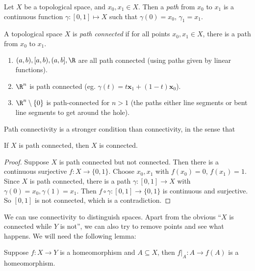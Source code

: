 \documentclass[a4paper]{article}
\begin{document}
\begin{defi}[Path]
  Let $X$ be a topological space, and $x_0, x_1 \in X$. Then a \emph{path} from $x_0$ to $x_1$ is a continuous function $\gamma: [0, 1] \mapsto X$ such that $\gamma(0) = x_0$, $\gamma_1 = x_1$.
\end{defi}

\begin{defi}
  A topological space $X$ is \emph{path connected} if for all points $x_0, x_1 \in X$, there is a path from $x_0$ to $x_1$.
\end{defi}

\begin{eg}\leavevmode
  \begin{enumerate}
    \item $(a, b), [a, b), (a, b], \R$ are all path connected (using paths given by linear functions).
    \item $\R^n$ is path connected (eg. $\gamma (t) = t \mathbf{x}_1 + (1 - t)\mathbf{x}_0$).
    \item $\R^n\setminus \{0\}$ is path-connected for $n > 1$ (the paths either line segments or bent line segments to get around the hole).
  \end{enumerate}
\end{eg}

Path connectivity is a stronger condition than connectivity, in the sense that
\begin{prop}
  If $X$ is path connected, then $X$ is connected.
\end{prop}

\begin{proof}
  Suppose $X$ is path connected but not connected. Then there is a continuous surjective $f: X\to \{0, 1\}$. Choose $x_0, x_1$ with $f(x_0) = 0$, $f(x_1) = 1$. Since $X$ is path connected, there is a path $\gamma: [0, 1] \to X$ with $\gamma (0) = x_0, \gamma(1) = x_1$. Then $f\circ \gamma: [0, 1] \to \{0, 1\}$ is continuous and surjective. So $[0, 1]$ is not connected, which is a contradiction.
\end{proof}

We can use connectivity to distinguish spaces. Apart from the obvious ``$X$ is connected while $Y$ is not'', we can also try to remove points and see what happens. We will need the following lemma:
\begin{lemma}
  Suppose $f: X\to Y$ is a homeomorphism and $A\subseteq X$, then $f|_A: A\to f(A)$ is a homeomorphism.
\end{lemma}
\end{document}
